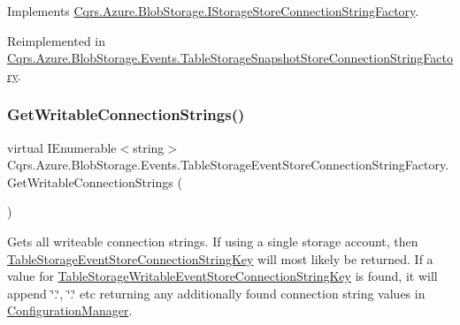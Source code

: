 Implements \hyperlink{interfaceCqrs_1_1Azure_1_1BlobStorage_1_1IStorageStoreConnectionStringFactory_a0ed836289e048767f753630bbcc98d5d_a0ed836289e048767f753630bbcc98d5d}{Cqrs.\+Azure.\+Blob\+Storage.\+I\+Storage\+Store\+Connection\+String\+Factory}.



Reimplemented in \hyperlink{classCqrs_1_1Azure_1_1BlobStorage_1_1Events_1_1TableStorageSnapshotStoreConnectionStringFactory_a092e6f4132d8cb0c1b25e0c19a3911ba_a092e6f4132d8cb0c1b25e0c19a3911ba}{Cqrs.\+Azure.\+Blob\+Storage.\+Events.\+Table\+Storage\+Snapshot\+Store\+Connection\+String\+Factory}.

\mbox{\label{classCqrs_1_1Azure_1_1BlobStorage_1_1Events_1_1TableStorageEventStoreConnectionStringFactory_a07406c2607bdd42dd13116b92fc6b665_a07406c2607bdd42dd13116b92fc6b665}} 
\subsubsection{\texorpdfstring{Get\+Writable\+Connection\+Strings()}{GetWritableConnectionStrings()}}
{\footnotesize\ttfamily virtual I\+Enumerable$<$string$>$ Cqrs.\+Azure.\+Blob\+Storage.\+Events.\+Table\+Storage\+Event\+Store\+Connection\+String\+Factory.\+Get\+Writable\+Connection\+Strings (\begin{DoxyParamCaption}{ }\end{DoxyParamCaption})\hspace{0.3cm}{\ttfamily [virtual]}}



Gets all writeable connection strings. If using a single storage account, then \hyperlink{classCqrs_1_1Azure_1_1BlobStorage_1_1Events_1_1TableStorageEventStoreConnectionStringFactory_a95f8662029c8a40117e326973de936bf_a95f8662029c8a40117e326973de936bf}{Table\+Storage\+Event\+Store\+Connection\+String\+Key} will most likely be returned. If a value for \hyperlink{classCqrs_1_1Azure_1_1BlobStorage_1_1Events_1_1TableStorageEventStoreConnectionStringFactory_a73df7618d5978a2c0d2e69880b799369_a73df7618d5978a2c0d2e69880b799369}{Table\+Storage\+Writable\+Event\+Store\+Connection\+String\+Key} is found, it will append \char`\"{}.\char`\"{}, \char`\"{}.\char`\"{} etc returning any additionally found connection string values in \hyperlink{namespaceCqrs_1_1Azure_1_1ConfigurationManager}{Configuration\+Manager}. 



